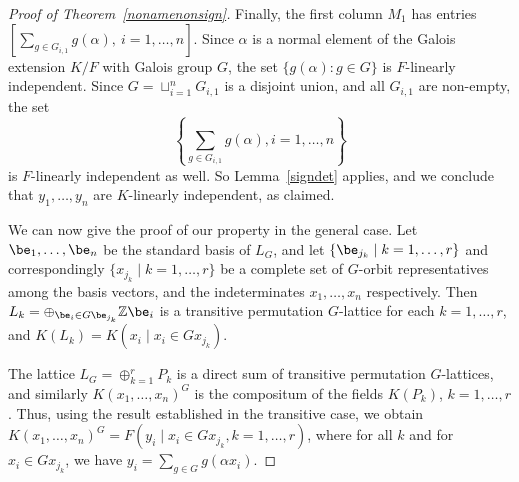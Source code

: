 \documentclass[12pt]{article}
\theoremstyle{plain}
\newcommand{\Z}{\ensuremath{\mathbb{Z}}}
\begin{document}
\begin{proof}[Proof of Theorem~\ref{nonamenonsign}]
  Finally, the first column $M_1$ has entries $[ \sum_{g \in
      G_{i,1}}g(\alpha),\ i = 1, \ldots,n ].$ Since $\alpha$ is a
  normal element of the Galois extension $K/F$ with Galois group $G$,
  the set $\lbrace g(\alpha): g \in G \rbrace$ is $F$-linearly
  independent. Since $G = \sqcup^n_{i =1}G_{i,1}$ is a disjoint union,
  and all $G_{i,1}$ are non-empty,
  the set
  $$\left\lbrace \sum_{g \in G_{i,1}}g(\alpha), i = 1, \ldots, n \right\rbrace$$ is
  $F$-linearly independent as well.
  So Lemma~\ref{signdet} applies, and we conclude that $y_1, \ldots,
  y_n$ are $K$-linearly independent, as claimed.

  \medskip 
  
  We can now give the proof of our property in the general case.
  Let $\be_1, \ldots , \be_n$ be the standard basis of
  $L_G$, and let $\{\be_{j_k} \mid k = 1, \ldots, r\}$ and
  correspondingly $\{x_{j_k} \mid k = 1, \ldots, r\}$ be a complete set
  of $G$-orbit representatives among the basis vectors, and the
  indeterminates $x_1, \ldots, x_n$ respectively. Then $L_k = \oplus_{
    \be_i \in G \be_{j_{k}} } \Z \be_i$ is a
  transitive permutation $G$-lattice for each $k = 1, \ldots, r$, and
  $K(L_k) = K(x_i \mid x_i \in Gx_{j_k})$.
  
  The lattice $L_G = \oplus^r_{k =1} P_k$ is a direct sum of transitive
  permutation $G$-lattices, and similarly $K(x_1,\dots,x_n)^G$ is the
  compositum of the fields $K(P_k)$, $k=1,\dots,r$. Thus, using the 
  result established in the transitive case, we obtain
  $K(x_1,\dots,x_n)^G=F(y_i \mid x_i \in Gx_{j_k}, k=1,\dots,r)$, where
  for all $k$ and for $x_i \in Gx_{j_k}$, we have $y_i=\sum_{g \in G}
  g(\alpha x_i)$.
\end{proof}
\end{document}
